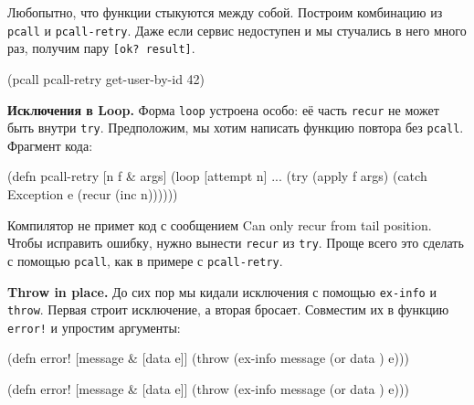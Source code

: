 Любопытно, что функции стыкуются между собой. Построим комбинацию из
\verb|pcall| и \verb|pcall-retry|. Даже если сервис недоступен и мы
стучались в него много раз, получим пару \verb|[ok? result]|.

\begin{english}
  \begin{clojure}
(pcall pcall-retry get-user-by-id 42)
  \end{clojure}
\end{english}

\textbf{Исключения в Loop.} Форма \verb|loop| устроена особо: её часть
\verb|recur| не может быть внутри \verb|try|. Предположим, мы хотим написать
функцию повтора без \verb|pcall|. Фрагмент кода:


\begin{english}
  \begin{clojure}
(defn pcall-retry [n f & args]
  (loop [attempt n]
    ...
    (try
      (apply f args)
      (catch Exception e
        (recur (inc n))))))
  \end{clojure}
\end{english}

Компилятор не примет код с сообщением Can only recur from tail
position. Чтобы исправить ошибку, нужно вынести \verb|recur| из
\verb|try|. Проще всего это сделать с помощью \verb|pcall|, как в примере с
\verb|pcall-retry|.

\textbf{Throw in place.} До сих пор мы кидали исключения с помощью
\verb|ex-info| и \verb|throw|. Первая строит исключение, а вторая
бросает. Совместим их в функцию \verb|error!| и упростим аргументы:


\ifx\DEVICETYPE\MOBILE

\begin{english}
  \begin{clojure}
(defn error! [message & [data e]]
  (throw (ex-info message
           (or data {}) e)))
  \end{clojure}
\end{english}

\else

\begin{english}
  \begin{clojure}
(defn error! [message & [data e]]
  (throw (ex-info message (or data {}) e)))
  \end{clojure}
\end{english}

